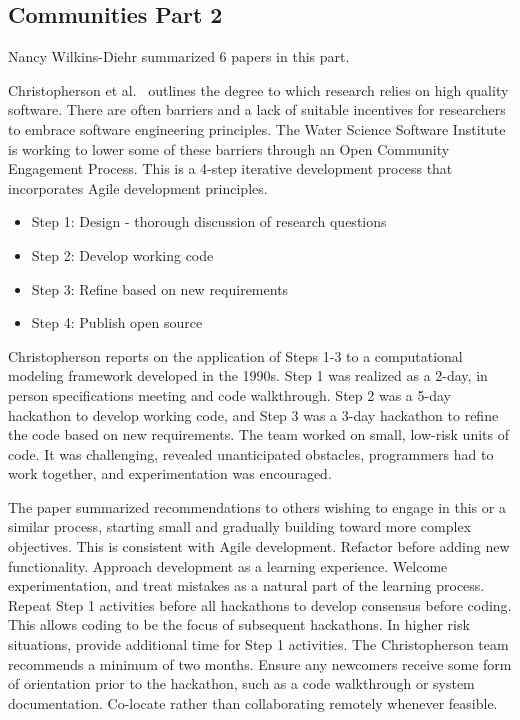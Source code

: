 \documentclass[11pt, oneside]{amsart}
\begin{document}
\subsection{Communities Part 2}

Nancy Wilkins-Diehr summarized 6 papers in this part.

Christopherson et al.~\cite{Christopherson_WSSSPE} outlines the degree to which research relies on high
quality software. There are often barriers and a lack of suitable incentives
for researchers to embrace software engineering principles. The Water Science
Software Institute is working to lower some of these barriers through an Open
Community Engagement Process. This is a 4-step iterative development process
that incorporates Agile development principles.

\begin{itemize}
\item Step 1: Design - thorough discussion of research questions
\item Step 2: Develop working code
\item Step 3: Refine based on new requirements
\item Step 4: Publish open source
\end{itemize}

Christopherson reports on the application of Steps 1-3 to a
computational modeling framework developed in the 1990s. Step 1 was realized as
a 2-day, in person specifications meeting and code walkthrough. Step 2 was a
5-day hackathon to develop working code, and Step 3 was a 3-day hackathon to refine
the code based on new requirements. The team worked on small, low-risk units of
code. It was challenging, revealed unanticipated obstacles, programmers had to
work together, and experimentation was encouraged.

The paper summarized recommendations to others wishing to engage in this or a
similar process, starting small and gradually building toward more complex
objectives. This is consistent with Agile development. Refactor before adding
new functionality. Approach development as a learning experience. Welcome
experimentation, and treat mistakes as a natural part of the learning process.
Repeat Step 1 activities before all hackathons to develop consensus before
coding. This allows coding to be the focus of subsequent hackathons. In higher
risk situations, provide additional time for Step 1 activities. The
Christopherson team recommends a minimum of two months. Ensure any newcomers
receive some form of orientation prior to the hackathon, such as a code
walkthrough or system documentation. Co-locate rather than collaborating
remotely whenever feasible.
\end{document}
